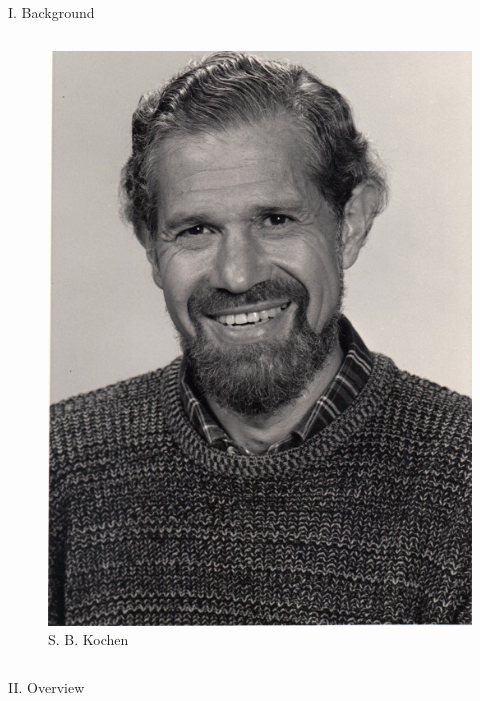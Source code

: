 \documentclass[final,hyperref={pdfpagelabels=false}]{beamer}
\begin{document}
\begin{frame}[t]
\begin{columns}[c]
\begin{column}{.31\textwidth}
\begin{block}{I. Background}
\begin{columns}
\begin{column}{0.3\textwidth}
\begin{figure}
              \includegraphics[width=0.8\linewidth]{kochen}
              \caption{S. B. Kochen}
            \end{figure}

          \end{column}
        \end{columns}
      \end{block}

      
      \begin{block}{II. Overview}


\end{block}
\end{column}
\end{columns}
\end{frame}
\end{document}
